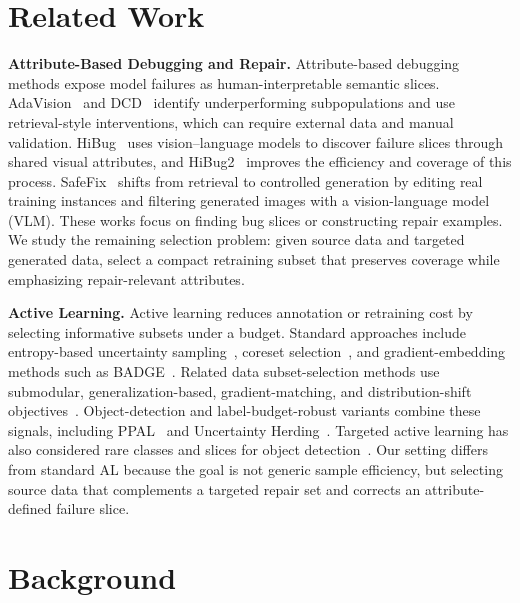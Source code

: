 \documentclass{article}
\newcommand{\hibug}{HiBug\xspace}
\begin{document}
\section{Related Work}



\noindent\textbf{Attribute-Based Debugging and Repair.} Attribute-based debugging methods expose model failures as human-interpretable semantic slices. AdaVision~\citep{gao2023adaptive} and DCD~\citep{singla2024data} identify underperforming subpopulations and use retrieval-style interventions, which can require external data and manual validation. \hibug~\citep{chen2023hibug} uses vision--language models to discover failure slices through shared visual attributes, and HiBug2~\citep{chen2025hibug2} improves the efficiency and coverage of this process. SafeFix~\citep{xu2025safefix} shifts from retrieval to controlled generation by editing real training instances and filtering generated images with a vision-language model (VLM). These works focus on finding bug slices or constructing repair examples. We study the remaining selection problem: given source data and targeted generated data, select a compact retraining subset that preserves coverage while emphasizing repair-relevant attributes.

\noindent\textbf{Active Learning.} Active learning reduces annotation or retraining cost by selecting informative subsets under a budget. Standard approaches include entropy-based uncertainty sampling~\citep{settles2009active}, coreset selection~\citep{sener2018active}, and gradient-embedding methods such as BADGE~\citep{ash2020deep}. Related data subset-selection methods use submodular, generalization-based, gradient-matching, and distribution-shift objectives~\citep{wei2015submodularity,killamsetty2021glister,killamsetty2021grad,kothawade2021similar,karanam2022orient}. Object-detection and label-budget-robust variants combine these signals, including PPAL~\citep{yang2024ppal} and Uncertainty Herding~\citep{bae2025uncertainty}. Targeted active learning has also considered rare classes and slices for object detection~\citep{kothawade2022talisman}. Our setting differs from standard AL because the goal is not generic sample efficiency, but selecting source data that complements a targeted repair set and corrects an attribute-defined failure slice.

\section{Background}
\end{document}
